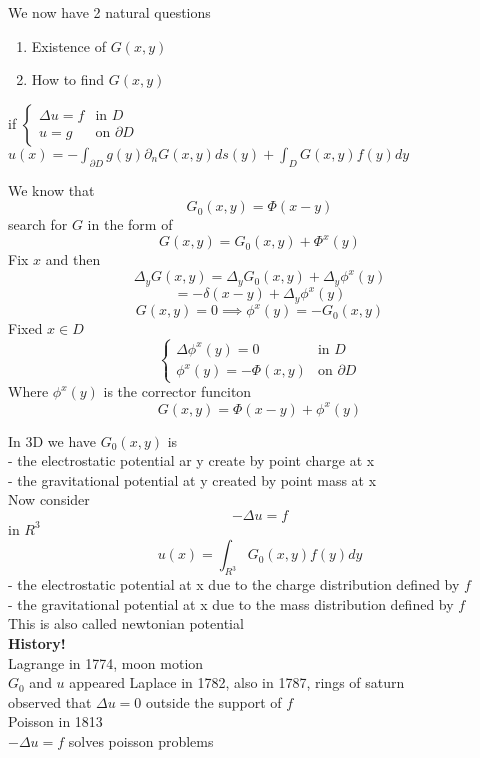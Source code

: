 \documentclass[answers,12pt,addpoints]{exam}
\begin{document}
We now have 2 natural questions
\begin{enumerate}
    \item Existence of $G(x,y)$
    \item How to find $G(x,y)$
\end{enumerate}
\begin{remark}
    if $\begin{cases}
        \Delta u = f & \text{in } D\\
        u = g & \text{on } \partial D
    \end{cases}$
    $u(x) = - \int_{\partial D} g(y) \partial_n G(x,y) ds(y) + \int_D G(x,y) f(y) dy$
\end{remark}
We know that 
$$G_0(x,y) = \Phi(x-y)$$
search for $G$ in the form of 
$$G(x,y) = G_0(x,y) + \Phi^{x}(y)$$
Fix $x$ and then 
$$\Delta_y G(x,y) = \Delta_y G_0(x,y) + \Delta_y \phi^{x}(y) $$
$$ = -\delta(x-y) + \Delta_y \phi^{x}(y)$$
$$G(x,y) = 0 \implies \phi^{x}(y) = -G_0(x,y)$$
Fixed $x \in D$\\
$$\begin{cases}
    \Delta \phi^{x}(y) = 0 & \text{in } D\\
    \phi^{x}(y) = -\Phi(x,y) & \text{on } \partial D
\end{cases}$$
Where $\phi^{x}(y)$ is the corrector funciton \\
$$G(x,y) = \Phi(x-y) + \phi^{x}(y)$$

In 3D we have $G_0(x,y)$ is \\
- the electrostatic potential ar y create by point charge at x\\
- the gravitational potential at y created by point mass at x\\
Now consider 
$$ - \Delta u = f$$
in $R^3$\\
$$ u(x) = \int_{R^3} G_0(x,y) f(y) dy$$
- the electrostatic potential at x due to the charge distribution defined by $f$\\
- the gravitational potential at x due to the mass distribution defined by $f$\\

This is also called newtonian potential\\

\textbf{History!}\\
Lagrange in 1774, moon motion\\
$G_0$ and $u$ appeared
Laplace in 1782, also in 1787, rings of saturn\\
observed that $\Delta u =0$ outside the support of $f$\\
Poisson in 1813\\
$- \Delta u = f$ solves poisson problems\\
\end{document}
